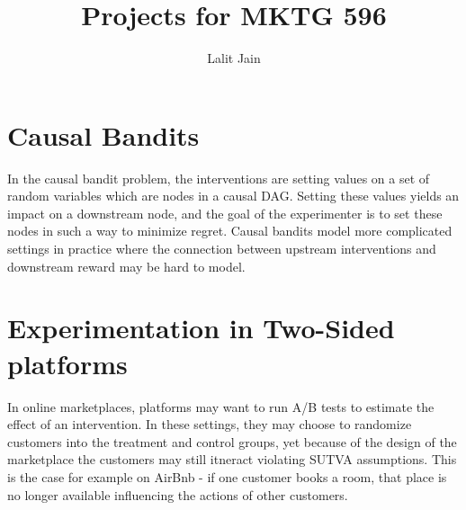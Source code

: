 \documentclass[11pt]{article}
\title{Projects for MKTG 596}
\author{Lalit Jain}
\newcommand{\1}[1]{\mathbf{1}\left\{#1\right\}}
\begin{document}
\maketitle

\section{Causal Bandits}
\begin{refsection}
In the causal bandit problem, the interventions are setting values on a set of random variables which are nodes in a causal DAG. Setting these values yields an impact on a downstream node, and the goal of the experimenter is to set these nodes in such a way to minimize regret. Causal bandits model more complicated settings in practice where the connection between upstream interventions and downstream reward may be hard to model.

\nocite{lattimore2016causal,lu2020regret, lu2021causal,sen2017identifying, bilodeau2022adaptively}


\printbibliography[heading=subbibliography]
\end{refsection}


\section{Experimentation in Two-Sided platforms}
\begin{refsection}
In online marketplaces, platforms may want to run A/B tests to estimate the effect of an intervention. In these settings, they may choose to randomize customers into the treatment and control groups, yet because of the design of the marketplace the customers may still itneract violating SUTVA assumptions. This is the case for example on AirBnb - if one customer books a room, that place is no longer available influencing the actions of other customers.

\nocite{johari2022experimental, goli2022bias, holtz2020reducing, bajari2021multiple}
\printbibliography[heading=subbibliography]
\end{refsection}
\end{document}
